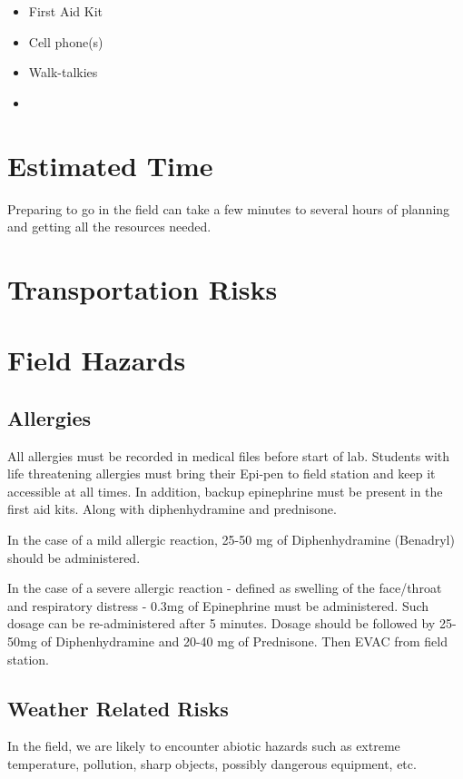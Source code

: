 \documentclass[12pt]{../SOP2}
\begin{document}
\begin{itemize}
  \item First Aid Kit
  \item Cell phone(s)
  \item Walk-talkies
  \item 
\end{itemize}

\section{Estimated Time}

\NP Preparing to go in the field can take a few minutes to several hours of planning and getting all the resources needed.

\section{Transportation Risks}



\section{Field Hazards}

\subsection{Allergies}

\NP All allergies must be recorded in medical files before start of lab. Students with life threatening allergies must bring their Epi-pen to field station and keep it accessible at all times. In addition, backup epinephrine must be present in the first aid kits. Along with diphenhydramine and prednisone. 

\NP In the case of a mild allergic reaction, 25-50 mg of Diphenhydramine (Benadryl) should be administered. 

\NP In the case of a severe allergic reaction - defined as swelling of the face/throat and respiratory distress - 0.3mg of Epinephrine must be administered. Such dosage can be re-administered after 5 minutes. Dosage should be followed by 25-50mg of Diphenhydramine and 20-40 mg of Prednisone. Then EVAC from field station. 

\subsection{Weather Related Risks}

\NP In the field, we are likely to encounter abiotic hazards such as extreme temperature, pollution, sharp objects, possibly dangerous equipment, etc. 
\end{document}
